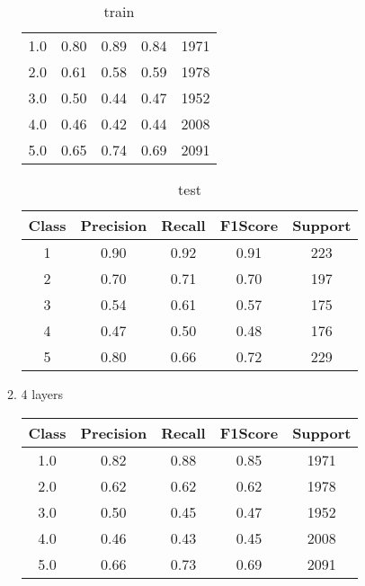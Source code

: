 \begin{enumerate}[label=(\alph*)]
\begin{enumerate}[label=\roman*.]
\begin{table}[!htb]
\begin{tabular}{ccccc}
            1.0   & 0.80      & 0.89   & 0.84    & 1971    \\
            2.0   & 0.61      & 0.58   & 0.59    & 1978    \\
            3.0   & 0.50      & 0.44   & 0.47    & 1952    \\
            4.0   & 0.46      & 0.42   & 0.44    & 2008    \\
            5.0   & 0.65      & 0.74   & 0.69    & 2091    \\ \hline
            \end{tabular}
            \caption{train}
            \label{part f train depth 3}
        \end{table}
        \begin{table}[!htb]
            \centering
            \begin{tabular}{ccccc}
            \hline
            Class & Precision & Recall & F1Score & Support \\ \hline
            1     & 0.90      & 0.92   & 0.91    & 223     \\
            2     & 0.70      & 0.71   & 0.70    & 197     \\
            3     & 0.54      & 0.61   & 0.57    & 175     \\
            4     & 0.47      & 0.50   & 0.48    & 176     \\
            5     & 0.80      & 0.66   & 0.72    & 229     \\ \hline
            \end{tabular}
            \caption{test}
            \label{part f test depth 3}
        \end{table}
        \item 4 layers
        \begin{table}[!htb]
            \centering
            \begin{tabular}{ccccc}
            \hline
            Class & Precision & Recall & F1Score & Support \\ \hline
            1.0   & 0.82      & 0.88   & 0.85    & 1971    \\
            2.0   & 0.62      & 0.62   & 0.62    & 1978    \\
            3.0   & 0.50      & 0.45   & 0.47    & 1952    \\
            4.0   & 0.46      & 0.43   & 0.45    & 2008    \\
            5.0   & 0.66      & 0.73   & 0.69    & 2091    \\ \hline
            \end{tabular}

\end{table}
\end{enumerate}
\end{enumerate}
